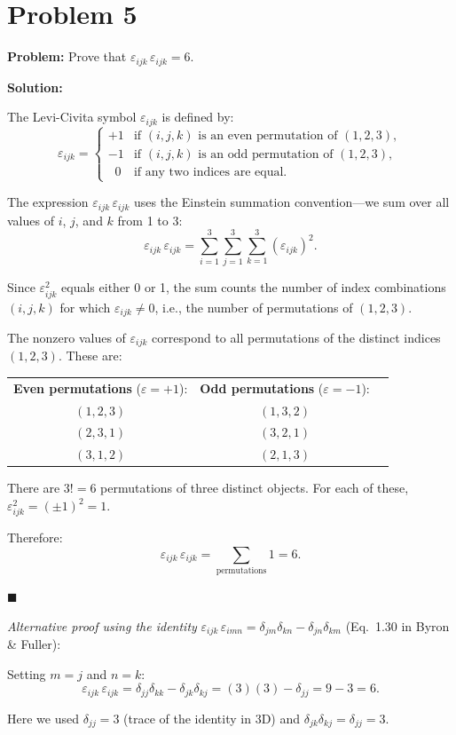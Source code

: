 \documentclass[12pt]{article}
\begin{document}
\section*{Problem 5}

\textbf{Problem:} Prove that $\varepsilon_{ijk}\,\varepsilon_{ijk} = 6$.

\bigskip
\textbf{Solution:}

The Levi-Civita symbol $\varepsilon_{ijk}$ is defined by:
\[
\varepsilon_{ijk} = \begin{cases}
+1 & \text{if $(i,j,k)$ is an even permutation of $(1,2,3)$}, \\
-1 & \text{if $(i,j,k)$ is an odd permutation of $(1,2,3)$}, \\
\;\;0 & \text{if any two indices are equal}.
\end{cases}
\]

The expression $\varepsilon_{ijk}\,\varepsilon_{ijk}$ uses the Einstein summation convention---we sum over all values of $i$, $j$, and $k$ from 1 to 3:
\[
\varepsilon_{ijk}\,\varepsilon_{ijk} = \sum_{i=1}^{3}\sum_{j=1}^{3}\sum_{k=1}^{3} (\varepsilon_{ijk})^2.
\]

Since $\varepsilon_{ijk}^2$ equals either 0 or 1, the sum counts the number of index combinations $(i,j,k)$ for which $\varepsilon_{ijk} \neq 0$, i.e., the number of permutations of $(1,2,3)$.

The nonzero values of $\varepsilon_{ijk}$ correspond to all permutations of the distinct indices $(1,2,3)$. These are:
\begin{center}
\begin{tabular}{ccc}
\textbf{Even permutations} ($\varepsilon = +1$): & \textbf{Odd permutations} ($\varepsilon = -1$): \\[4pt]
$(1,2,3)$ & $(1,3,2)$ \\
$(2,3,1)$ & $(3,2,1)$ \\
$(3,1,2)$ & $(2,1,3)$
\end{tabular}
\end{center}

There are $3! = 6$ permutations of three distinct objects. For each of these, $\varepsilon_{ijk}^2 = (\pm 1)^2 = 1$.

Therefore:
\[
\varepsilon_{ijk}\,\varepsilon_{ijk} = \sum_{\text{permutations}} 1 = \boxed{6}.
\]

\hfill $\blacksquare$

\medskip
\textit{Alternative proof using the identity} $\varepsilon_{ijk}\,\varepsilon_{imn} = \delta_{jm}\delta_{kn} - \delta_{jn}\delta_{km}$ (Eq.~1.30 in Byron \& Fuller):

Setting $m = j$ and $n = k$:
\[
\varepsilon_{ijk}\,\varepsilon_{ijk} = \delta_{jj}\delta_{kk} - \delta_{jk}\delta_{kj} = (3)(3) - \delta_{jj} = 9 - 3 = 6.
\]

Here we used $\delta_{jj} = 3$ (trace of the identity in 3D) and $\delta_{jk}\delta_{kj} = \delta_{jj} = 3$.
\end{document}

